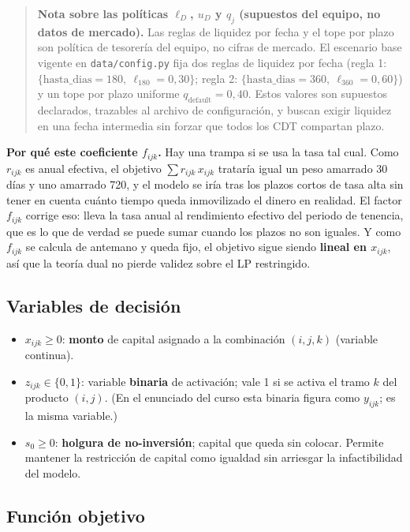 \documentclass[11pt,a4paper]{article}
\begin{document}
\begin{quote}
\textbf{Nota sobre las políticas $\ell_D$, $u_D$ y $q_j$ (supuestos del equipo, no datos de mercado).} Las reglas de liquidez por fecha y el tope por plazo son política de tesorería del equipo, no cifras de mercado. El escenario base vigente en \texttt{data/config.py} fija dos reglas de liquidez por fecha (regla 1: $\{\text{hasta\_dias}=180,\ \ell_{180}=0{,}30\}$; regla 2: $\{\text{hasta\_dias}=360,\ \ell_{360}=0{,}60\}$) y un tope por plazo uniforme $q_{\text{default}} = 0{,}40$. Estos valores son supuestos declarados, trazables al archivo de configuración, y buscan exigir liquidez en una fecha intermedia sin forzar que todos los CDT compartan plazo.
\end{quote}

\textbf{Por qué este coeficiente $f_{ijk}$.} Hay una trampa si se usa la tasa tal cual. Como
$r_{ijk}$ es anual efectiva, el objetivo $\sum r_{ijk}\,x_{ijk}$ trataría igual un peso
amarrado 30 días y uno amarrado 720, y el modelo se iría tras los plazos cortos de tasa alta
sin tener en cuenta cuánto tiempo queda inmovilizado el dinero en realidad. El factor
$f_{ijk}$ corrige eso: lleva la tasa anual al rendimiento efectivo del periodo de tenencia, que
es lo que de verdad se puede sumar cuando los plazos no son iguales. Y como $f_{ijk}$ se
calcula de antemano y queda fijo, el objetivo sigue siendo \textbf{lineal en $x_{ijk}$}, así
que la teoría dual no pierde validez sobre el LP restringido.

\subsection{Variables de decisión}

\begin{itemize}
  \item $x_{ijk} \ge 0$: \textbf{monto} de capital asignado a la combinación $(i, j, k)$ (variable continua).
  \item $z_{ijk} \in \{0, 1\}$: variable \textbf{binaria} de activación; vale 1 si se activa el tramo $k$ del producto $(i, j)$. (En el enunciado del curso esta binaria figura como $y_{ijk}$; es la misma variable.)
  \item $s_0 \ge 0$: \textbf{holgura de no-inversión}; capital que queda sin colocar. Permite mantener la restricción de capital como igualdad sin arriesgar la infactibilidad del modelo.
\end{itemize}

\subsection{Función objetivo}
\end{document}
